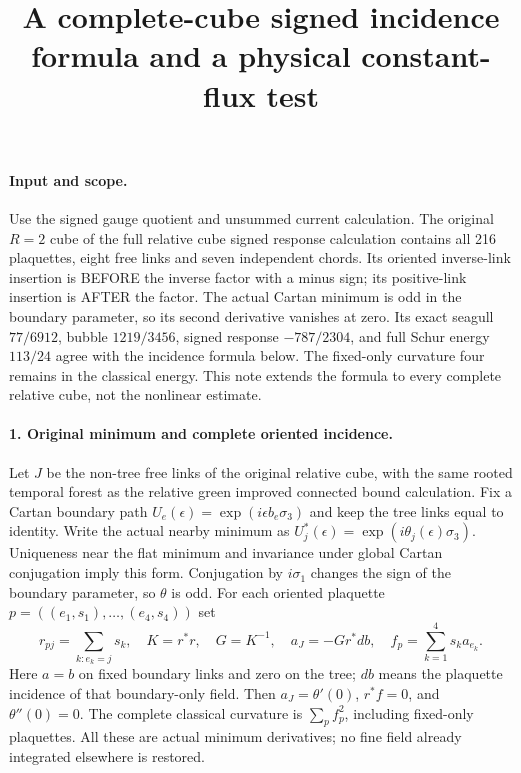\documentclass[11pt]{article}
\title{A complete-cube signed incidence formula and a physical constant-flux test}\author{}\date{}
\begin{document}
\maketitle
\paragraph{Input and scope.}
Use the signed gauge quotient and unsummed current calculation. The original $R=2$ cube of the full relative cube signed response calculation contains all 216
plaquettes, eight free links and seven independent chords. Its oriented
inverse-link insertion is BEFORE the inverse factor with a minus sign;
its positive-link insertion is AFTER the factor. The actual Cartan minimum
is odd in the boundary parameter, so its second derivative vanishes at
zero. Its exact seagull $77/6912$, bubble $1219/3456$, signed response
$-787/2304$, and full Schur energy $113/24$ agree with the incidence
formula below. The fixed-only curvature four remains in the classical
energy. This note extends the formula to every complete relative cube,
not the nonlinear estimate.

\paragraph{1. Original minimum and complete oriented incidence.}
Let $J$ be the non-tree free links of the original relative cube, with the
same rooted temporal forest as the relative green improved connected bound calculation. Fix a Cartan boundary path
$U_e(\epsilon)=\exp(i\epsilon b_e\sigma_3)$ and keep the tree links equal
to identity. Write the actual nearby minimum as
$U_j^*(\epsilon)=\exp(i\theta_j(\epsilon)\sigma_3)$.
Uniqueness near the flat minimum and invariance under global Cartan
conjugation imply this form. Conjugation by $i\sigma_1$ changes the sign
of the boundary parameter, so $\theta$ is odd. For each oriented plaquette
$p=((e_1,s_1),\ldots,(e_4,s_4))$ set
\[
 r_{pj}=\sum_{k:e_k=j}s_k,\quad K=r^*r,\quad G=K^{-1},\quad
 a_J=-G r^* d b,\quad f_p=\sum_{k=1}^4s_k a_{e_k}.                  \tag{1}
\]
Here $a=b$ on fixed boundary links and zero on the tree; $db$ means the
plaquette incidence of that boundary-only field. Then $a_J=\theta'(0)$,
$r^*f=0$, and $\theta''(0)=0$. The complete classical curvature is
$\sum_p f_p^2$, including fixed-only plaquettes. All these are actual
minimum derivatives; no fine field already integrated elsewhere is restored.
\end{document}
